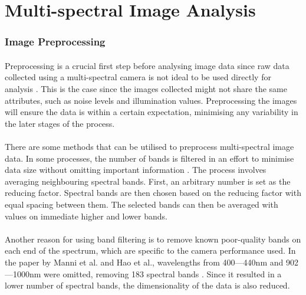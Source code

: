 \documentclass[12pt]{article}
\begin{document}
\section{Multi-spectral Image Analysis}
    \subsubsection*{Image Preprocessing}
    \paragraph{}
    Preprocessing is a crucial first step before analysing image data since raw data collected using a multi-spectral camera is not ideal to be used directly for analysis \cite{wu_review_2022}. This is the case since the images collected might not share the same attributes, such as noise levels and illumination values. Preprocessing the images will ensure the data is within a certain expectation, minimising any variability in the later stages of the process.
    
    \paragraph{}
    There are some methods that can be utilised to preprocess multi-spectral image data. In some processes, the number of bands is filtered in an effort to minimise data size without omitting important information \cite{fabelo_helicoid_2016, ortega_hyperspectral_2020}. The process involves averaging neighbouring spectral bands. First, an arbitrary number is set as the reducing factor. Spectral bands are then chosen based on the reducing factor with equal spacing between them. The selected bands can then be averaged with values on immediate higher and lower bands.
    
    \paragraph{}
    Another reason for using band filtering is to remove known poor-quality bands on each end of the spectrum, which are specific to the camera performance used. In the paper by Manni et al. and Hao et al., wavelengths from 400—440nm and 902—1000nm were omitted, removing 183 spectral bands \cite{hao_fusing_2021, manni_hyperspectral_2020}. Since it resulted in a lower number of spectral bands, the dimensionality of the data is also reduced.
\end{document}
